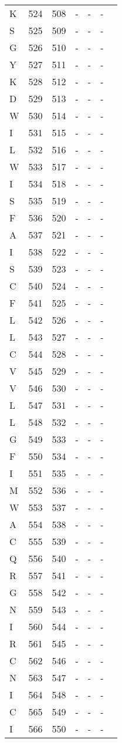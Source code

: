 \begin{longtable}{lllllll}
  K & 524 & 508 & - & - & - &  \\ 
  S & 525 & 509 & - & - & - &  \\ 
  G & 526 & 510 & - & - & - &  \\ 
  Y & 527 & 511 & - & - & - &  \\ 
  K & 528 & 512 & - & - & - &  \\ 
  D & 529 & 513 & - & - & - &  \\ 
  W & 530 & 514 & - & - & - &  \\ 
  I & 531 & 515 & - & - & - &  \\ 
  L & 532 & 516 & - & - & - &  \\ 
  W & 533 & 517 & - & - & - &  \\ 
  I & 534 & 518 & - & - & - &  \\ 
  S & 535 & 519 & - & - & - &  \\ 
  F & 536 & 520 & - & - & - &  \\ 
  A & 537 & 521 & - & - & - &  \\ 
  I & 538 & 522 & - & - & - &  \\ 
  S & 539 & 523 & - & - & - &  \\ 
  C & 540 & 524 & - & - & - &  \\ 
  F & 541 & 525 & - & - & - &  \\ 
  L & 542 & 526 & - & - & - &  \\ 
  L & 543 & 527 & - & - & - &  \\ 
  C & 544 & 528 & - & - & - &  \\ 
  V & 545 & 529 & - & - & - &  \\ 
  V & 546 & 530 & - & - & - &  \\ 
  L & 547 & 531 & - & - & - &  \\ 
  L & 548 & 532 & - & - & - &  \\ 
  G & 549 & 533 & - & - & - &  \\ 
  F & 550 & 534 & - & - & - &  \\ 
  I & 551 & 535 & - & - & - &  \\ 
  M & 552 & 536 & - & - & - &  \\ 
  W & 553 & 537 & - & - & - &  \\ 
  A & 554 & 538 & - & - & - &  \\ 
  C & 555 & 539 & - & - & - &  \\ 
  Q & 556 & 540 & - & - & - &  \\ 
  R & 557 & 541 & - & - & - &  \\ 
  G & 558 & 542 & - & - & - &  \\ 
  N & 559 & 543 & - & - & - &  \\ 
  I & 560 & 544 & - & - & - &  \\ 
  R & 561 & 545 & - & - & - &  \\ 
  C & 562 & 546 & - & - & - &  \\ 
  N & 563 & 547 & - & - & - &  \\ 
  I & 564 & 548 & - & - & - &  \\ 
  C & 565 & 549 & - & - & - &  \\ 
  I & 566 & 550 & - & - & - &  \\ 
   \hline
\hline
\end{longtable}
